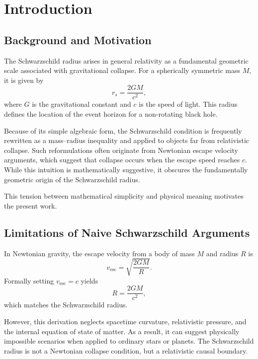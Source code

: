 \documentclass[12pt,a4paper]{article}
\begin{document}
\newpage

\section{Introduction}

\subsection{Background and Motivation}

The Schwarzschild radius arises in general relativity as a fundamental geometric scale associated with gravitational collapse. For a spherically symmetric mass $M$, it is given by
\begin{equation}
r_s = \frac{2GM}{c^2},
\end{equation}
where $G$ is the gravitational constant and $c$ is the speed of light. This radius defines the location of the event horizon for a non-rotating black hole.

Because of its simple algebraic form, the Schwarzschild condition is frequently rewritten as a mass--radius inequality and applied to objects far from relativistic collapse. Such reformulations often originate from Newtonian escape velocity arguments, which suggest that collapse occurs when the escape speed reaches $c$. While this intuition is mathematically suggestive, it obscures the fundamentally geometric origin of the Schwarzschild radius.

This tension between mathematical simplicity and physical meaning motivates the present work.

\subsection{Limitations of Naive Schwarzschild Arguments}

In Newtonian gravity, the escape velocity from a body of mass $M$ and radius $R$ is
\begin{equation}
v_{\text{esc}} = \sqrt{\frac{2GM}{R}}.
\end{equation}
Formally setting $v_{\text{esc}} = c$ yields
\begin{equation}
R = \frac{2GM}{c^2},
\end{equation}
which matches the Schwarzschild radius.

However, this derivation neglects spacetime curvature, relativistic pressure, and the internal equation of state of matter. As a result, it can suggest physically impossible scenarios when applied to ordinary stars or planets. The Schwarzschild radius is not a Newtonian collapse condition, but a relativistic causal boundary.
\end{document}
